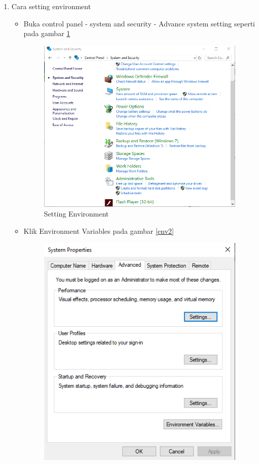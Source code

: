 \begin{enumerate}
    \item Cara setting environment
    \begin{itemize}
        \item Buka control panel - system and security - Advance system setting seperti pada gambar \ref{env1}
    \begin{figure}[!htbp]
    \centering 
    \includegraphics[scale=0.6]{figures/env1.PNG} 
    \caption{Setting Environment}
    \label{env1}
    \end{figure}
    \item Klik Environment Variables pada gambar \ref{env2}
    \begin{figure}[!htbp]
    \centering 
    \includegraphics[scale=0.7]{figures/env2.PNG} 

\end{figure}
\end{itemize}
\end{enumerate}
